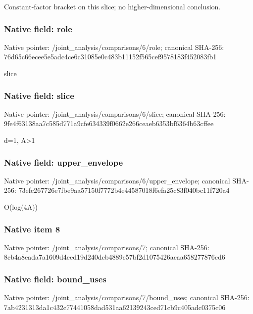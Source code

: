 \documentclass[10pt,a4paper]{article}
\begin{document}
\begingroup\raggedright\sloppy Constant-factor bracket on this slice;\allowbreak{} no higher-dimensional conclusion.\par\endgroup

\subsubsection{Native field: role}
Native pointer: /joint\_\allowbreak{}analysis/comparisons/6/role; canonical SHA-256: 76d65c66ecee5e5adc4ce6c31085e0c483b11152f565cef9578183f452083fb1

\begingroup\raggedright\sloppy slice\par\endgroup

\subsubsection{Native field: slice}
Native pointer: /joint\_\allowbreak{}analysis/comparisons/6/slice; canonical SHA-256: 9fe4f63138aa7c585d771a9cfe634339f0662e266ceaeb6353bf6364b63cffee

\begingroup\raggedright\sloppy d=\allowbreak{}1,\allowbreak{} A>1\par\endgroup

\subsubsection{Native field: upper\_\allowbreak{}envelope}
Native pointer: /joint\_\allowbreak{}analysis/comparisons/6/upper\_\allowbreak{}envelope; canonical SHA-256: 73efc267726e7fbe9aa57150f7772b4e44587018f6efa25c83f040bc11f720a4

\begingroup\raggedright\sloppy O(log(4A))\par\endgroup

\subsubsection{Native item 8}
Native pointer: /joint\_\allowbreak{}analysis/comparisons/7; canonical SHA-256: 8cb4a8eada7a1609d4eed19d240dcb4889c57bf2d1075426acaa658277876cd6

\subsubsection{Native field: bound\_\allowbreak{}uses}
Native pointer: /joint\_\allowbreak{}analysis/comparisons/7/bound\_\allowbreak{}uses; canonical SHA-256: 7ab4231313da1c432c77441058dad531aa62139243ced71cb9c405adc0375c06
\end{document}
